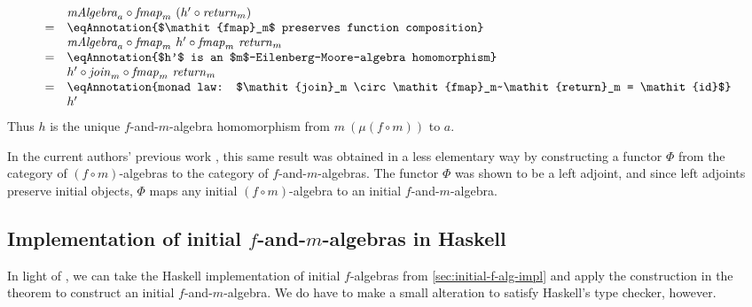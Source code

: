\begin{proof*}
\begin{enumerate}
\begin{displaymath}
\begin{array}{cl}
        &\mathit{mAlgebra}_a \circ \mathit{fmap}_m~(h' \circ \mathit{return}_m) \\
        =&\eqAnnotation{$\mathit{fmap}_m$ preserves function composition} \\
        &\mathit{mAlgebra}_a \circ \mathit{fmap}_m~{h'} \circ \mathit{fmap}_m~\mathit{return}_m \\
        =&\eqAnnotation{$h'$ is an $m$-Eilenberg-Moore-algebra homomorphism} \\
        &h' \circ \mathit{join}_m \circ \mathit{fmap}_m~\mathit{return}_m \\
        =&\eqAnnotation{monad law: $\mathit{join}_m \circ \mathit{fmap}_m~\mathit{return}_m = \mathit{id}$} \\
        &h'
      \end{array}
    \end{displaymath}
    Thus $h$ is the unique $f$-and-$m$-algebra homomorphism from
    $m~(\mu (f \circ m))$ to $a$. \mathproofbox
  \end{enumerate}
\end{proof*}

In the current authors' previous work \cite{atkey12fibrational}, this
same result was obtained in a less elementary way by constructing a
functor $\Phi$ from the category of $(f \circ m)$-algebras to the
category of $f$-and-$m$-algebras. The functor $\Phi$ was shown to be a
left adjoint, and since left adjoints preserve initial objects, $\Phi$
maps any initial $(f \circ m)$-algebra to an initial
$f$-and-$m$-algebra.


\subsection{Implementation of initial $f$-and-$m$-algebras in Haskell}
\label{sec:f-and-m-alg-impl}


In light of , we can take the
Haskell implementation of initial $f$-algebras from
\autoref{sec:initial-f-alg-impl} and apply the construction in the
theorem to construct an initial $f$-and-$m$-algebra. We do have to
make a small alteration to satisfy Haskell's type checker, however.

